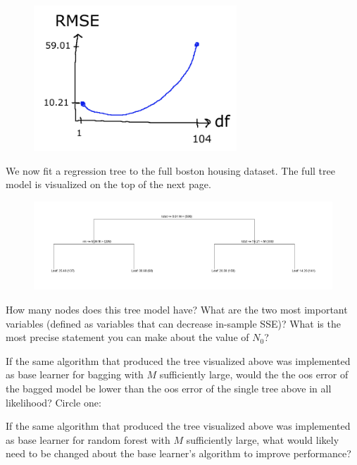 \documentclass[12pt]{article}
\begin{document}
\begin{figure}[htp]
\centering
\includegraphics[width=3in]{oosRMSE}
\end{figure} 

We now fit a regression tree to the full boston housing dataset. The full tree model is visualized on the top of the next page.
 
\begin{figure}[htp]
\centering
\hspace*{-2cm}\includegraphics[width=8.2in]{tree.png}
\end{figure} 

 How many nodes does this tree model have?
 What are the two most important variables (defined as variables that can decrease in-sample SSE)?
 What is the most precise statement you can make about the value of $N_0$?
\pagebreak

 If the same algorithm that produced the tree visualized above was implemented as base learner for bagging with $M$ sufficiently large, would the the oos error of the bagged model be lower than the oos error of the single tree above in all likelihood? Circle one:  

 If the same algorithm that produced the tree visualized above was implemented as base learner for random forest with $M$ sufficiently large, what would likely need to be changed about the base learner's algorithm to improve performance?\\ 
\end{document}
